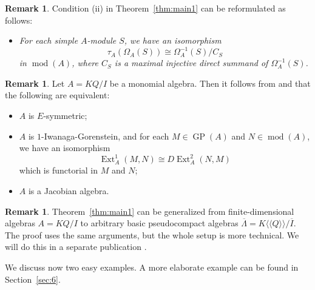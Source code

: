 \documentclass[12pt,reqno]{amsart}
\theoremstyle{definition}
\newtheorem{Rem}[Thm]{Remark}
\newcommand{\cpQ}{\langle\!\langle Q \rangle\!\rangle}
\newcommand{\md}{\operatorname{mod}}
\newcommand{\GP}{\operatorname{GP}}
\newcommand{\Ext}{\operatorname{Ext}}
\newcommand{\bLam}{{\overline{\Lambda}}}
\begin{document}
\begin{Rem}
Condition (ii) in Theorem~\ref{thm:main1} can be reformulated as follows:
\begin{itemize}\itemsep2mm

\item[]
\emph{
For each simple $A$-module $S$, we have 
an isomorphism
$$
\tau_A(\Omega_A(S)) \cong \Omega_A^{-1}(S)/C_S
$$ 
in $\md(A)$, where $C_S$ is a maximal injective direct summand
of $\Omega_A^{-1}(S)$.}

\end{itemize}
\end{Rem}


\begin{Rem}
Let $A = KQ/I$ be a monomial algebra.
Then it follows from
\cite[Theorem~1.3]{BS26} and \cite[Theorem~1]{GE21}
that
the following are equivalent:
\begin{itemize}\itemsep2mm

\item[(i)]
$A$ is $E$-symmetric;

\item[(ii)]
$A$ is $1$-Iwanaga-Gorenstein, and for each $M \in \GP(A)$ and $N \in \md(A)$, we have an isomorphism
$$
\Ext_A^1(M,N) \cong D\!\Ext_A^2(N,M)
$$
which is functorial in $M$ and $N$;

\item[(iii)]
$A$ is a Jacobian algebra.

\end{itemize}
\end{Rem}


\begin{Rem}
Theorem~\ref{thm:main1} can be generalized from 
finite-dimensional algebras 
$A = KQ/I$ to
arbitrary basic pseudocompact algebras
$\bLam = K\cpQ/\overline{I}$. 
The proof uses the same arguments, but the whole setup is more technical. 
We will do this in a separate publication \cite{BHS26}. 
\end{Rem}

We discuss now two easy examples. A more elaborate example
can be found in Section~\ref{sec:6}.
\end{document}
